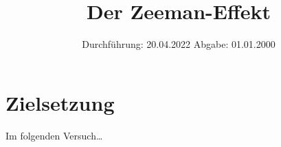 

\subject{V27}
\title{Der Zeeman-Effekt}
\date{
    Durchführung: 20.04.2022
     \hspace{3em}
    Abgabe: 01.01.2000
}


\maketitle
\thispagestyle{empty}
\tableofcontents
\newpage

\section{Zielsetzung}

    Im folgenden Versuch…


\clearpage


\clearpage


\clearpage


\clearpage

\printbibliography


